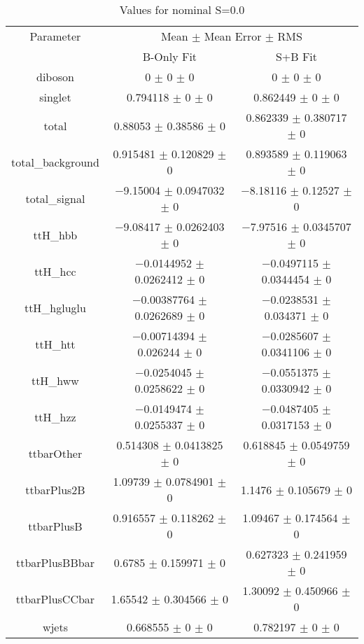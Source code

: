 \begin{table}
\centering
\caption{Values for nominal S=0.0}
\begin{tabular}{ccc}
\toprule
Parameter & \multicolumn{2}{c}{Mean $\pm$ Mean Error $\pm$ RMS}\\
 & B-Only Fit & S+B Fit\\
\midrule
diboson & \num{0} $\pm$ \num{0} $\pm$ \num{0} & \num{0} $\pm$ \num{0} $\pm$ \num{0}\\
singlet & \num{0.794118} $\pm$ \num{0} $\pm$ \num{0} & \num{0.862449} $\pm$ \num{0} $\pm$ \num{0}\\
total & \num{0.88053} $\pm$ \num{0.38586} $\pm$ \num{0} & \num{0.862339} $\pm$ \num{0.380717} $\pm$ \num{0}\\
total\_background & \num{0.915481} $\pm$ \num{0.120829} $\pm$ \num{0} & \num{0.893589} $\pm$ \num{0.119063} $\pm$ \num{0}\\
total\_signal & \num{-9.15004} $\pm$ \num{0.0947032} $\pm$ \num{0} & \num{-8.18116} $\pm$ \num{0.12527} $\pm$ \num{0}\\
ttH\_hbb & \num{-9.08417} $\pm$ \num{0.0262403} $\pm$ \num{0} & \num{-7.97516} $\pm$ \num{0.0345707} $\pm$ \num{0}\\
ttH\_hcc & \num{-0.0144952} $\pm$ \num{0.0262412} $\pm$ \num{0} & \num{-0.0497115} $\pm$ \num{0.0344454} $\pm$ \num{0}\\
ttH\_hgluglu & \num{-0.00387764} $\pm$ \num{0.0262689} $\pm$ \num{0} & \num{-0.0238531} $\pm$ \num{0.034371} $\pm$ \num{0}\\
ttH\_htt & \num{-0.00714394} $\pm$ \num{0.026244} $\pm$ \num{0} & \num{-0.0285607} $\pm$ \num{0.0341106} $\pm$ \num{0}\\
ttH\_hww & \num{-0.0254045} $\pm$ \num{0.0258622} $\pm$ \num{0} & \num{-0.0551375} $\pm$ \num{0.0330942} $\pm$ \num{0}\\
ttH\_hzz & \num{-0.0149474} $\pm$ \num{0.0255337} $\pm$ \num{0} & \num{-0.0487405} $\pm$ \num{0.0317153} $\pm$ \num{0}\\
ttbarOther & \num{0.514308} $\pm$ \num{0.0413825} $\pm$ \num{0} & \num{0.618845} $\pm$ \num{0.0549759} $\pm$ \num{0}\\
ttbarPlus2B & \num{1.09739} $\pm$ \num{0.0784901} $\pm$ \num{0} & \num{1.1476} $\pm$ \num{0.105679} $\pm$ \num{0}\\
ttbarPlusB & \num{0.916557} $\pm$ \num{0.118262} $\pm$ \num{0} & \num{1.09467} $\pm$ \num{0.174564} $\pm$ \num{0}\\
ttbarPlusBBbar & \num{0.6785} $\pm$ \num{0.159971} $\pm$ \num{0} & \num{0.627323} $\pm$ \num{0.241959} $\pm$ \num{0}\\
ttbarPlusCCbar & \num{1.65542} $\pm$ \num{0.304566} $\pm$ \num{0} & \num{1.30092} $\pm$ \num{0.450966} $\pm$ \num{0}\\
wjets & \num{0.668555} $\pm$ \num{0} $\pm$ \num{0} & \num{0.782197} $\pm$ \num{0} $\pm$ \num{0}\\
\bottomrule
\end{tabular}
\end{table}